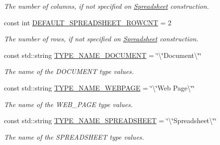 \begin{DoxyCompactItemize}
\begin{DoxyCompactList}\small\item\em The number of columns, if not specified on \hyperlink{classdocs_1_1Spreadsheet}{Spreadsheet} construction. \end{DoxyCompactList}\item 
\hypertarget{namespacedocs_a7562daac15433871b1cc71ad74555032}{const int \hyperlink{namespacedocs_a7562daac15433871b1cc71ad74555032}{D\-E\-F\-A\-U\-L\-T\-\_\-\-S\-P\-R\-E\-A\-D\-S\-H\-E\-E\-T\-\_\-\-R\-O\-W\-C\-N\-T} = 2}\label{namespacedocs_a7562daac15433871b1cc71ad74555032}

\begin{DoxyCompactList}\small\item\em The number of rows, if not specified on \hyperlink{classdocs_1_1Spreadsheet}{Spreadsheet} construction. \end{DoxyCompactList}\item 
\hypertarget{namespacedocs_a88f8e41b03147cf4197261676999d12c}{const std\-::string \hyperlink{namespacedocs_a88f8e41b03147cf4197261676999d12c}{T\-Y\-P\-E\-\_\-\-N\-A\-M\-E\-\_\-\-D\-O\-C\-U\-M\-E\-N\-T} = \char`\"{}\textbackslash{}\char`\"{}Document\textbackslash{}\char`\"{}\char`\"{}}\label{namespacedocs_a88f8e41b03147cf4197261676999d12c}

\begin{DoxyCompactList}\small\item\em The name of the D\-O\-C\-U\-M\-E\-N\-T type values. \end{DoxyCompactList}\item 
\hypertarget{namespacedocs_ac41cf3635e22c3750deddd000fd4c34b}{const std\-::string \hyperlink{namespacedocs_ac41cf3635e22c3750deddd000fd4c34b}{T\-Y\-P\-E\-\_\-\-N\-A\-M\-E\-\_\-\-W\-E\-B\-P\-A\-G\-E} = \char`\"{}\textbackslash{}\char`\"{}Web Page\textbackslash{}\char`\"{}\char`\"{}}\label{namespacedocs_ac41cf3635e22c3750deddd000fd4c34b}

\begin{DoxyCompactList}\small\item\em The name of the W\-E\-B\-\_\-\-P\-A\-G\-E type values. \end{DoxyCompactList}\item 
\hypertarget{namespacedocs_a3f58481f03c01b3da04828585d14ff77}{const std\-::string \hyperlink{namespacedocs_a3f58481f03c01b3da04828585d14ff77}{T\-Y\-P\-E\-\_\-\-N\-A\-M\-E\-\_\-\-S\-P\-R\-E\-A\-D\-S\-H\-E\-E\-T} = \char`\"{}\textbackslash{}\char`\"{}Spreadsheet\textbackslash{}\char`\"{}\char`\"{}}\label{namespacedocs_a3f58481f03c01b3da04828585d14ff77}

\begin{DoxyCompactList}\small\item\em The name of the S\-P\-R\-E\-A\-D\-S\-H\-E\-E\-T type values. \end{DoxyCompactList}\end{DoxyCompactItemize}


